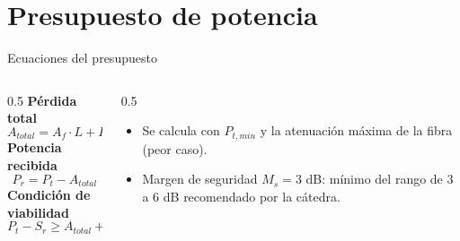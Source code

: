 \documentclass[aspectratio=1610]{beamer}
\begin{document}
\section[Presupuesto]{Presupuesto de potencia}
\begin{frame}{Ecuaciones del presupuesto}
  \begin{columns}[T]
    \begin{column}{0.5\textwidth}
      \textbf{Pérdida total}
      \[ A_{total} = A_f \cdot L + P_c + P_{em} \]
      \textbf{Potencia recibida}
      \[ P_r = P_t - A_{total} \]
      \textbf{Condición de viabilidad}
      \[ P_t - S_r \geq A_{total} + M_s \]
    \end{column}
    \begin{column}{0.5\textwidth}
      \begin{itemize}
        \item Se calcula con $P_{t,min}$ y la atenuación máxima de la fibra (peor caso).
        \item Margen de seguridad $M_s = 3$ dB: mínimo del rango de 3 a 6 dB recomendado por la cátedra.
      \end{itemize}
    \end{column}
  \end{columns}
\end{frame}
\end{document}
